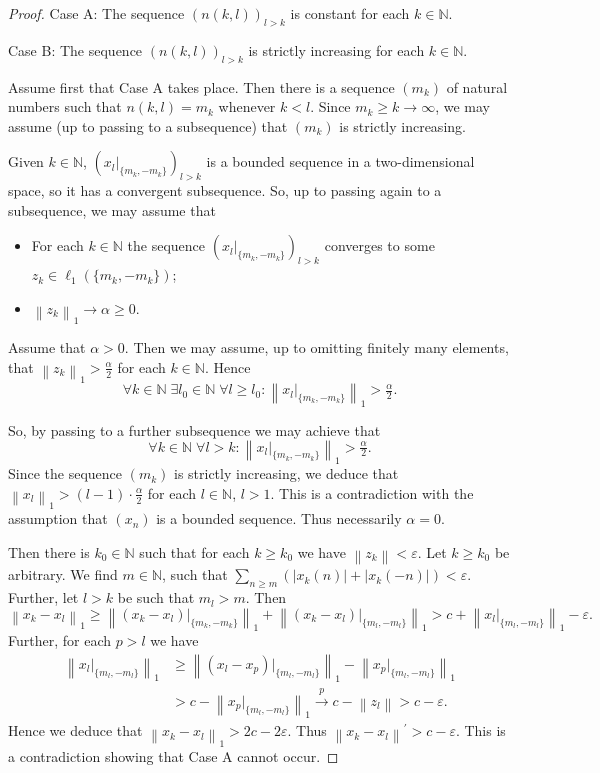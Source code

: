 \documentclass{amsart}
\numberwithin{equation}{section}
\theoremstyle{definition}
\def\ep{\varepsilon}
\def\en{\mathbb N}
\newcommand{\norm}[1]{\left\|#1\right\|}
\newcommand{\abs}[1]{\left|#1\right|}
\begin{document}
\begin{proof}
Case A: The sequence $(n(k,l))_{l>k}$ is constant for each $k\in\en$.

Case B: The sequence $(n(k,l))_{l>k}$ is strictly increasing for each $k\in\en$.

Assume first that Case A takes place. Then there is a sequence $(m_k)$ of natural numbers such that $n(k,l)=m_k$ whenever $k<l$. Since $m_k\ge k\to\infty$, we may assume (up to passing to a subsequence) that $(m_k)$ is strictly increasing.

Given $k\in \en$, $(x_l|_{\{m_k,-m_k\}})_{l>k}$ is a bounded sequence in a two-dimensional space, so it has a convergent subsequence. So, up to passing again to a subsequence, we may assume that
\begin{itemize}
    \item For each $k\in \en$ the sequence $(x_l|_{\{m_k,-m_k\}})_{l>k}$ converges to some $z_k\in\ell_1(\{m_k,-m_k\})$;
    \item $\norm{z_k}_1\to \alpha\ge0$.
\end{itemize}

Assume that $\alpha>0$. Then we may assume, up to omitting finitely many elements, that $\norm{z_k}_1>\frac\alpha2$ for each $k\in\en$. Hence
$$\forall k\in\en\;\exists l_0\in\en\;\forall l\ge l_0\colon  \norm{x_l|_{\{m_k,-m_k\}}}_1>\tfrac\alpha2.$$

So, by passing to a further subsequence we may achieve that
$$\forall k\in\en\;\forall l>k \colon  \norm{x_l|_{\{m_k,-m_k\}}}_1>\tfrac\alpha2.$$
Since the sequence $(m_k)$ is strictly increasing, we deduce that $\norm{x_l}_1>(l-1)\cdot\frac\alpha2$ for each $l\in\en$, $l>1$. This is a contradiction with the assumption that $(x_n)$ is a bounded sequence.
Thus necessarily $\alpha=0$.

 Then there is $k_0\in\en$ such that for each $k\ge k_0$ we have $\norm{z_k}<\ep$. Let $k\ge k_0$ be arbitrary. We find $m\in\en$, such that $\sum_{n\ge m}(\abs{x_k(n)}+\abs{x_k(-n)})<\ep$. Further, let $l>k$ be such that $m_l>m$. Then
$$\norm{x_k-x_l}_1\ge \norm{(x_k-x_l)|_{\{m_k,-m_k\}}}_1+\norm{(x_k-x_l)|_{\{m_l,-m_l\}}}_1 >c+ \norm{x_l|_{\{m_l,-m_l\}}}_1-\ep.$$
Further, for each $p>l$ we have
$$\begin{aligned}
    \norm{x_l|_{\{m_l,-m_l\}}}_1&\ge \norm{(x_l-x_p)|_{\{m_l,-m_l\}}}_1 -\norm{x_p|_{\{m_l,-m_l\}}}_1 \\& > c- \norm{x_p|_{\{m_l,-m_l\}}}_1\overset{p}{\longrightarrow} c-\norm{z_l}>c-\ep.\end{aligned}$$
Hence we deduce that $\norm{x_k-x_l}_1>2c-2\ep$. Thus $\norm{x_k-x_l}^\prime>c-\ep$. This is a contradiction showing that Case A cannot occur. 


\end{proof}
\end{document}
